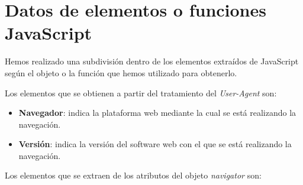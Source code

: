 \section{Datos de elementos o funciones JavaScript}
 Hemos realizado una subdivisión dentro de los elementos extraídos de JavaScript según el objeto o la función que hemos utilizado para obtenerlo.\par
\noindent Los elementos que se obtienen a partir del tratamiento del \textit{User-Agent} son:
\begin{itemize}
    \item \textbf{Navegador}: indica la plataforma web mediante la cual se está realizando la navegación.
    \item \textbf{Versión}: indica la versión del software web con el que se está realizando la navegación.
\end{itemize}
\noindent Los elementos que se extraen de los atributos del objeto \textit{navigator} son:
